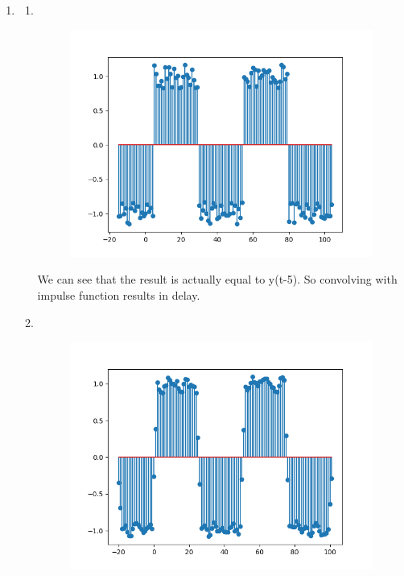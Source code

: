 \documentclass[10pt,a4paper, margin=1in]{article}
\begin{document}
\begin{enumerate}
\item %
    \begin{enumerate}
    \item~\\
    \begin{figure}[H]
        \includegraphics[scale = 0.75]{7_a.png}
    \end{figure}
    We can see that the result is actually equal to y(t-5). So convolving with impulse function results in delay.\\
    \item ~\\
    \begin{figure}[H]
        \includegraphics[scale=0.75]{7_b1.png}

\end{figure}
\end{enumerate}
\end{enumerate}
\end{document}
